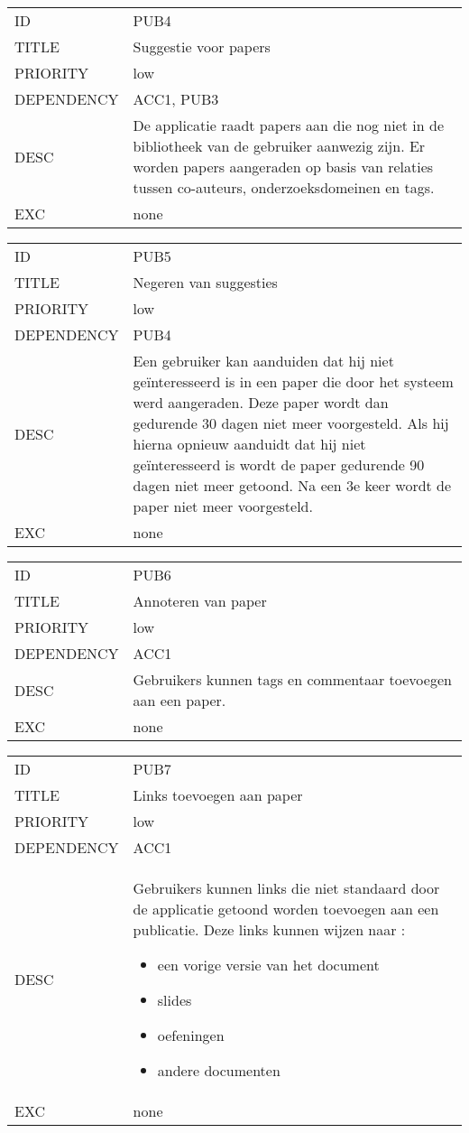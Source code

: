 \begin{longtable}{lp{10cm}}
ID           & PUB4\\
TITLE        & Suggestie voor papers\\
PRIORITY     & low\\
DEPENDENCY   & ACC1, PUB3\\
DESC         &  De applicatie raadt papers aan die nog niet in de bibliotheek van de gebruiker aanwezig zijn. Er worden papers aangeraden op basis van relaties tussen co-auteurs, onderzoeksdomeinen en tags.  \\
EXC          & none   
\end{longtable}

\begin{longtable}{lp{10cm}}
ID           & PUB5\\
TITLE        & Negeren van suggesties\\
PRIORITY     & low\\
DEPENDENCY   & PUB4\\
DESC         & Een gebruiker kan aanduiden dat hij niet geïnteresseerd is in een paper die door het systeem werd aangeraden. Deze paper wordt dan gedurende 30 dagen niet meer voorgesteld. Als hij hierna opnieuw aanduidt dat hij niet geïnteresseerd is wordt de paper gedurende 90 dagen niet meer getoond. Na een 3e keer wordt de paper niet meer voorgesteld.\\
EXC          & none     
\end{longtable}

\begin{longtable}{lp{10cm}}
ID           & PUB6\\
TITLE        & Annoteren van paper\\
PRIORITY     & low\\
DEPENDENCY   & ACC1\\
DESC         & Gebruikers kunnen tags en commentaar toevoegen aan een paper.\\
EXC          & none 
\end{longtable}

\begin{longtable}{lp{10cm}}
ID           & PUB7\\
TITLE        & Links toevoegen aan paper\\
PRIORITY     & low\\
DEPENDENCY   & ACC1\\
DESC         & Gebruikers kunnen links die niet standaard door de applicatie getoond worden toevoegen aan een publicatie.
Deze links kunnen wijzen naar :
\begin{itemize}
\item een vorige versie van het document
\item slides
\item oefeningen
\item andere documenten
\end{itemize}\\
EXC          & none
\end{longtable}

